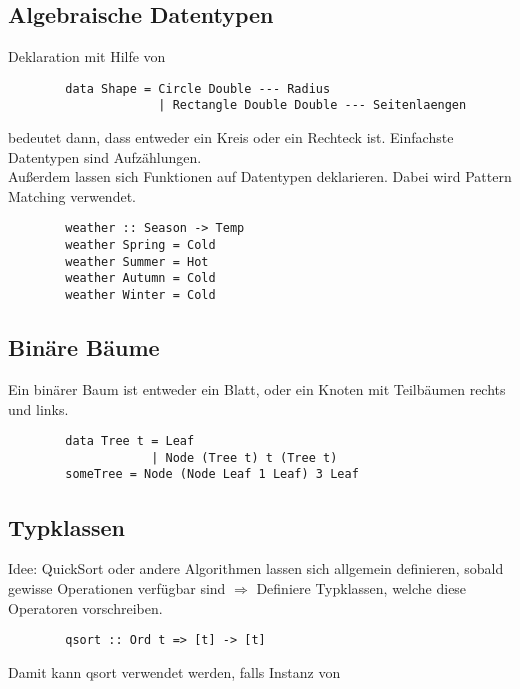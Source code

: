 \subsection{Algebraische Datentypen}%
\label{hsk:sub:algebraische-datentypen}
Deklaration mit Hilfe von 
\begin{lstlisting}
        data Shape = Circle Double --- Radius
                     | Rectangle Double Double --- Seitenlaengen
\end{lstlisting}
 bedeutet dann, dass  entweder ein Kreis oder ein Rechteck ist.
Einfachste Datentypen sind Aufzählungen.\\
Außerdem lassen sich Funktionen auf Datentypen deklarieren. Dabei wird Pattern Matching verwendet.
\begin{lstlisting}
        weather :: Season -> Temp
        weather Spring = Cold
        weather Summer = Hot
        weather Autumn = Cold
        weather Winter = Cold
\end{lstlisting}

\subsection{Binäre Bäume}%
\label{hsk:sub:binaere-baeume}
Ein binärer Baum ist entweder ein Blatt, oder ein Knoten mit Teilbäumen rechts und links.
\begin{lstlisting}
        data Tree t = Leaf
                    | Node (Tree t) t (Tree t)
        someTree = Node (Node Leaf 1 Leaf) 3 Leaf 
\end{lstlisting}
\newpage
\subsection{Typklassen}%
\label{hsk:sub:typklassen}
Idee: QuickSort oder andere Algorithmen lassen sich allgemein definieren, sobald gewisse Operationen verfügbar sind
\(\Rightarrow\) Definiere Typklassen, welche diese Operatoren vorschreiben.
\begin{lstlisting}
        qsort :: Ord t => [t] -> [t]
\end{lstlisting}
Damit kann qsort verwendet werden, falls  Instanz von \\

